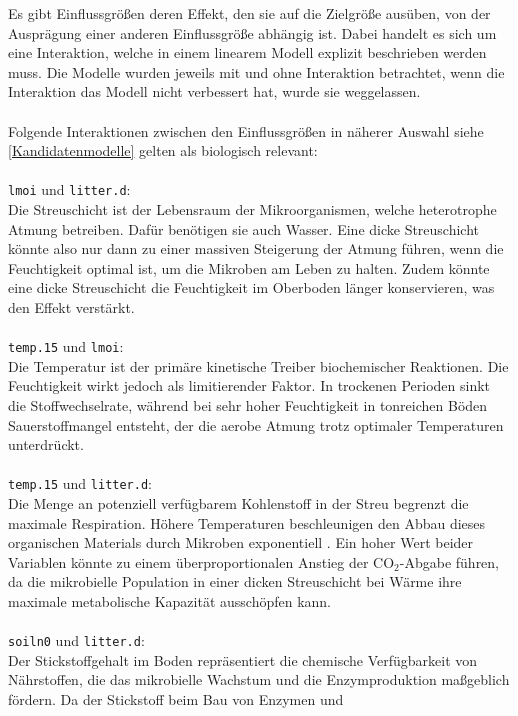 Es gibt Einflussgrößen deren Effekt, den sie auf die Zielgröße ausüben, von der Ausprägung
einer anderen Einflussgröße abhängig ist. Dabei handelt es sich um eine Interaktion, welche in einem
linearem Modell explizit beschrieben werden muss. Die Modelle wurden jeweils mit und ohne Interaktion betrachtet,
wenn die Interaktion das Modell nicht verbessert hat, wurde sie weggelassen.
\\
\\
Folgende Interaktionen zwischen den Einflussgrößen in näherer Auswahl siehe \ref{Kandidatenmodelle} gelten als biologisch relevant:
\\
\\
\texttt{lmoi} und \texttt{litter.d}:\\
Die Streuschicht ist der Lebensraum der Mikroorganismen, welche heterotrophe Atmung betreiben.
Dafür benötigen sie auch Wasser. Eine dicke Streuschicht könnte also nur dann zu einer massiven Steigerung
der Atmung führen, wenn die Feuchtigkeit optimal ist, um die Mikroben am Leben zu halten. Zudem könnte
eine dicke Streuschicht die Feuchtigkeit im Oberboden länger konservieren, was den Effekt verstärkt.
\\
\\
\texttt{temp.15} und \texttt{lmoi}:\\
Die Temperatur ist der primäre kinetische Treiber biochemischer Reaktionen.
Die Feuchtigkeit wirkt jedoch als limitierender Faktor. In trockenen Perioden sinkt die
Stoffwechselrate, während bei sehr hoher Feuchtigkeit in tonreichen Böden
Sauerstoffmangel entsteht, der die aerobe Atmung trotz optimaler Temperaturen unterdrückt. \cite{diss}
\\
\\
\texttt{temp.15} und \texttt{litter.d}:\\
Die Menge an potenziell verfügbarem Kohlenstoff in der Streu begrenzt die maximale Respiration.
Höhere Temperaturen beschleunigen den Abbau dieses organischen Materials durch Mikroben exponentiell \cite{diss}.
Ein hoher Wert beider Variablen könnte zu einem überproportionalen Anstieg der CO$_2$-Abgabe führen,
da die mikrobielle Population in einer dicken Streuschicht bei Wärme ihre maximale metabolische Kapazität
ausschöpfen kann.
\\
\\
\texttt{soiln0} und \texttt{litter.d}:\\
Der Stickstoffgehalt im Boden repräsentiert die chemische Verfügbarkeit von Nährstoffen, die das
mikrobielle Wachstum und die Enzymproduktion maßgeblich fördern. Da der Stickstoff beim Bau von Enzymen und
